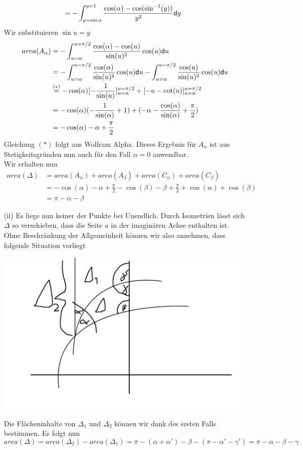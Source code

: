 \documentclass{book}
\renewcommand{\d}{\textsf{d}}
\begin{document}
\begin{Beweis}{}
\begin{enumerate}[(i)]
\begin{align*}
		&= -\int_{y = \sin \alpha}^{y = 1} \frac{\cos(\alpha) - \cos(\sin\i (y))}{y^2} \d y
		\end{align*}
		Wir substituieren $\sin u = y$
		\begin{align*}
		area(A_\alpha) &= -\int_{u = \alpha}^{u = \pi / 2} \frac{\cos(\alpha) - \cos(u)}{\sin(u)^2}\cos(u) \d u\\
		&= -\int_{u = \alpha}^{u = \pi / 2} \frac{\cos(\alpha)}{\sin(u)^2}\cos(u) \d u - \int_{u = \alpha}^{u = \pi / 2} \frac{ \cos(u)}{\sin(u)^2}\cos(u) \d u\\
		&\gl{(\ast)} -\cos(\alpha) [-\frac{1}{\sin(u)}]_{u = \alpha}^{u = \pi / 2} + [- u -\cot(u)]_{u = \alpha}^{u = \pi / 2}\\
		&= -\cos(\alpha)( - \frac{1}{\sin(\alpha)} + 1 ) + (-\alpha - \frac{\cos(\alpha)}{\sin (\alpha)} + \frac{\pi}{2})\\
		&= -\cos(\alpha) - \alpha +\frac{\pi}{2}
		\end{align*}
		Gleichung $(\ast)$ folgt aus Wolfram Alpha. Dieses Ergebnis für $A_\alpha$ ist aus Stetigkeitsgründen nun auch für den Fall $\alpha = 0$ anwendbar.\\
		Wir erhalten nun
		\begin{align*}
		area(\Delta) &= area(A_\alpha) + area(A_\beta)+ area(C_\alpha) + area(C_\beta) \\
		&= -\cos(\alpha) - \alpha +\frac{\pi}{2} -\cos(\beta) - \beta +\frac{\pi}{2} + \cos(\alpha)+\cos(\beta) \\
		&= \pi - \alpha - \beta
		\end{align*}
		
		\item[(ii)] Es liege nun keiner der Punkte bei Unendlich. Durch Isometrien lässt sich $\Delta$ so verschieben, dass die Seite $a$ in der imaginären Achse enthalten ist. Ohne Beschränkung der Allgemeinheit können wir also annehmen, dass folgende Situation vorliegt
		\begin{center}
			\includegraphics[scale = 0.3]{Skizze2.png}	
		\end{center}
		Die Flächeninhalte von $\Delta_1$ und $\Delta_2$ können wir dank des ersten Falls bestimmen. Es folgt nun
		\[ area(\Delta) = area(\Delta_2) - area(\Delta_1) = \pi - (\alpha + \alpha') - \beta - (\pi - \alpha' - \gamma') = \pi - \alpha - \beta - \gamma \]
	\end{enumerate}
\end{Beweis}
\end{document}
